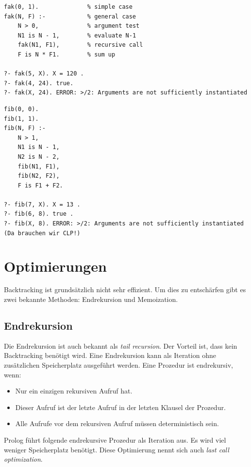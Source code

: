 \begin{lstlisting}[caption=Fakultät]
fak(0, 1). 				% simple case
fak(N, F) :- 			% general case
	N > 0, 				% argument test
	N1 is N - 1, 		% evaluate N-1
	fak(N1, F1), 		% recursive call
	F is N * F1. 		% sum up

?- fak(5, X). X = 120 .
?- fak(4, 24). true.
?- fak(X, 24). ERROR: >/2: Arguments are not sufficiently instantiated
\end{lstlisting}

\begin{lstlisting}[caption=Fibonacci, label=lst:naiv-fib]
% Naive Implementierung! Optimierung mittels Endrekursion und Assertions.
fib(0, 0).
fib(1, 1).
fib(N, F) :-
	N > 1,
	N1 is N - 1,
	N2 is N - 2,
	fib(N1, F1),
	fib(N2, F2),
	F is F1 + F2.

?- fib(7, X). X = 13 .
?- fib(6, 8). true .
?- fib(X, 8). ERROR: >/2: Arguments are not sufficiently instantiated (Da brauchen wir CLP!)
\end{lstlisting}

\section{Optimierungen}

Backtracking ist grundsätzlich nicht sehr effizient. Um dies zu entschärfen gibt es zwei bekannte Methoden: Endrekursion und Memoization.

\subsection{Endrekursion}
Die Endrekursion ist auch bekannt als \emph{tail recursion}. Der Vorteil ist, dass kein Backtracking benötigt wird. Eine Endrekursion kann als Iteration ohne zusätzlichen Speicherplatz ausgeführt werden. Eine Prozedur ist endrekursiv, wenn:

\begin{itemize}
	\item Nur ein einzigen rekursiven Aufruf hat.
	\item Dieser Aufruf ist der letzte Aufruf in der letzten Klausel der Prozedur.
	\item Alle Aufrufe vor dem rekursiven Aufruf müssen deterministisch sein.
\end{itemize}

Prolog führt folgende endrekursive Prozedur als Iteration aus. Es wird viel weniger Speicherplatz benötigt. Diese Optimierung nennt sich auch \emph{last call optimization}.


